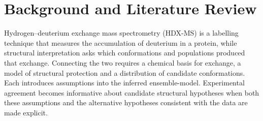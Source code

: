






\chapter{Background and Literature Review}
\label{ch:background}

Hydrogen--deuterium exchange mass spectrometry (HDX-MS) is a labelling technique that measures the accumulation of deuterium in a protein, while structural interpretation asks which conformations and populations produced that exchange. Connecting the two requires a chemical basis for exchange, a model of structural protection and a distribution of candidate conformations. Each introduces assumptions into the inferred ensemble-model. Experimental agreement becomes informative about candidate structural hypotheses when both these assumptions and the alternative hypotheses consistent with the data are made explicit.\supercite{bradshawInterpretationHDXData2020,bonomiPrinciplesProteinStructural2017}


